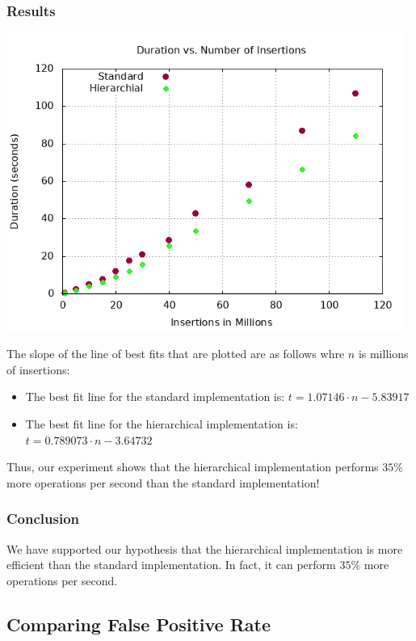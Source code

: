 \subsubsection{Results}
\begin{center}
    \includegraphics[width=13cm]{plots/scale-nm.png}
\end{center}
The slope of the line of best fits that are plotted are as follows whre $n$ is millions of insertions:
\begin{itemize}
    \item The best fit line for the standard implementation is: $t = 1.07146\cdot n - 5.83917$
    \item The best fit line for the hierarchical implementation is: $t = 0.789073\cdot n -3.64732 $
\end{itemize}
Thus, our experiment shows that the hierarchical implementation performs $35\%$ more operations per second than the standard implementation!

\subsubsection{Conclusion}
We have supported our hypothesis that the hierarchical implementation is more efficient than the standard implementation. In fact, it can perform $35\%$ more operations per second.


\subsection{Comparing False Positive Rate}

